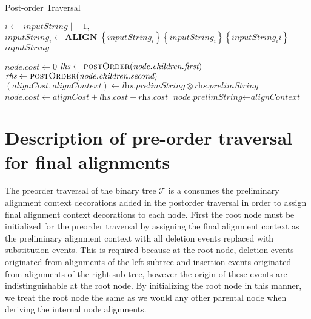 \documentclass[11pt]{article}
\begin{document}
\begin{algorithm}
  \caption{Post-order Traversal}\label{postOrder}
  \begin{algorithmic}[1]
      \State $i \gets \vert\textit{inputString} \;\vert - 1,$
        \State $\textit{inputString}_i \gets \textbf{ALIGN} \; \left\{ \textit{inputString}_i\right\} \left\{ \textit{inputString}_i \right\} \left\{ \textit{inputString}_ii \right\}$
      \EndWhile 
      \Return $\textit{inputString}$
    \EndFunction 
        
        \State $\textit{node.cost} \gets 0$
      \Else
        \State $\textit{lhs}  \gets \Call{postOrder}{\textit{node.children.first}}$
        \State $\textit{rhs}  \gets \Call{postOrder}{\textit{node.children.second}}$
        \State $\left(\textit{alignCost}, \textit{alignContext}\right) \gets \textit{lhs.prelimString} \otimes \textit{rhs.prelimString}$
        \State $\textit{node.cost} \gets \textit{alignCost} + \textit{lhs.cost} + \textit{rhs.cost}$
        \State $\textit{node.prelimString} \gets \textit{alignContext}$
      \EndIf
    \EndFunction
  \end{algorithmic}
\end{algorithm}


\section{Description of pre-order traversal for final alignments}
The preorder traversal of the binary tree $\mathcal{T}$ is a consumes the preliminary alignment context decorations added in the postorder traversal in order to assign final alignment context decorations to each node.
First the root node must be initialized for the preorder traversal by assigning the final alignment context as the preliminary alignment context with all deletion events replaced with substitution events.
This is required because at the root node, deletion events originated from  alignments of the left subtree and insertion events originated from alignments of the right sub tree, however the origin of these events are indistinguishable at the root node.
By initializing the root node in this manner, we treat the root node the same as we would any other parental node when deriving the internal node alignments.
\end{document}
